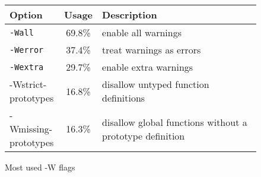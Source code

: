 \documentclass[9pt, a4paper, twocolumn]{article}
\begin{document}
\begin{figure}[H]
	\centering
	\begin{tabular}{l | c | p{}}
		Option & Usage & Description \\
		\hline
		\verb'-Wall' & 69.8\% & enable all warnings \\
		\verb'-Werror' & 37.4\% & treat warnings as errors \\
		\verb'-Wextra' & 29.7\% & enable extra warnings \\
		\makecell[l]{-Wstrict- \\ prototypes} & 16.8\% & disallow untyped function definitions \\
		\makecell[l]{-Wmissing- \\ prototypes} & 16.3\% & disallow global functions without a prototype definition\\
	\end{tabular}
	\caption{Most used -W flags}
	\label{fig:usage:W}
\end{figure}
\end{document}
